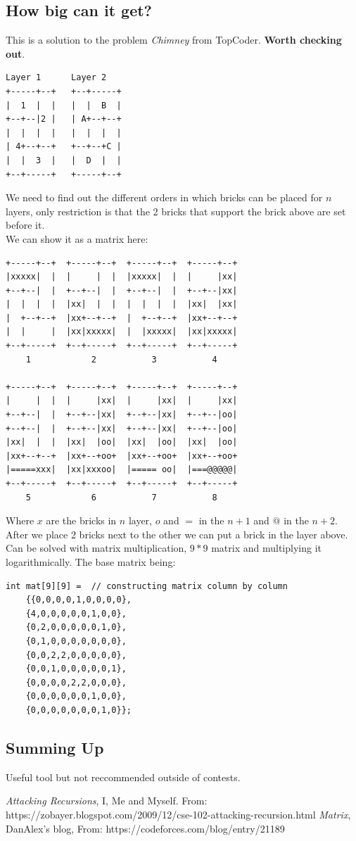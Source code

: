 \documentclass{IEEEtran}
\begin{document}
        \subsection{How big can it get?}
            This is a solution to the problem \textit{Chimney} from TopCoder. \textbf{Worth checking out}.
            \begin{lstlisting}
Layer 1      Layer 2
+-----+--+   +--+-----+
|  1  |  |   |  |  B  |
+--+--|2 |   | A+--+--+
|  |  |  |   |  |  |  |
| 4+--+--+   +--+--+C |
|  |  3  |   |  D  |  |
+--+-----+   +-----+--+
            \end{lstlisting}
            We need to find out the different orders in which bricks can be placed for $n$ layers, only restriction is that the 2 bricks that support the brick above are set before it.\\
            We can show it as a matrix here:
            \begin{lstlisting}
+-----+--+  +-----+--+  +-----+--+  +-----+--+ 
|xxxxx|  |  |     |  |  |xxxxx|  |  |     |xx|  
+--+--|  |  +--+--|  |  +--+--|  |  +--+--|xx|    
|  |  |  |  |xx|  |  |  |  |  |  |  |xx|  |xx|    
|  +--+--+  |xx+--+--+  |  +--+--+  |xx+--+--+  
|  |     |  |xx|xxxxx|  |  |xxxxx|  |xx|xxxxx|  
+--+-----+  +--+-----+  +--+-----+  +--+-----+   
    1            2           3           4

+-----+--+  +-----+--+  +-----+--+  +-----+--+
|     |  |  |     |xx|  |     |xx|  |     |xx|
+--+--|  |  +--+--|xx|  +--+--|xx|  +--+--|oo| 
+--+--|  |  +--+--|xx|  +--+--|xx|  +--+--|oo|
|xx|  |  |  |xx|  |oo|  |xx|  |oo|  |xx|  |oo|
|xx+--+--+  |xx+--+oo+  |xx+--+oo+  |xx+--+oo+
|=====xxx|  |xx|xxxoo|  |===== oo|  |===@@@@@|  
+--+-----+  +--+-----+  +--+-----+  +--+-----+ 
    5            6           7           8
            \end{lstlisting}
            Where $x$ are the bricks in $n$ layer, $o$ and $=$ in the $n+1$ and $@$ in the $n+2$. After we place 2 bricks next to the other we can put a brick in the layer above.\\
            Can be solved with matrix multiplication, $9*9$ matrix and multiplying it logarithmically. The base matrix being:
            \begin{lstlisting}
int mat[9][9] =  // constructing matrix column by column
    {{0,0,0,0,1,0,0,0,0},
    {4,0,0,0,0,0,1,0,0},
    {0,2,0,0,0,0,0,1,0},
    {0,1,0,0,0,0,0,0,0},
    {0,0,2,2,0,0,0,0,0},
    {0,0,1,0,0,0,0,0,1},
    {0,0,0,0,2,2,0,0,0},
    {0,0,0,0,0,0,1,0,0},
    {0,0,0,0,0,0,0,1,0}};
            \end{lstlisting}
        \subsection{Summing Up}
            Useful tool but not reccommended outside of contests.

\begin{thebibliography}{}
        \textit{Attacking Recursions},
        I, Me and Myself.
        From: https://zobayer.blogspot.com/2009/12/cse-102-attacking-recursion.html
        \textit{Matrix},
        DanAlex's blog,
        From: https://codeforces.com/blog/entry/21189
\end{thebibliography}
\end{document}
